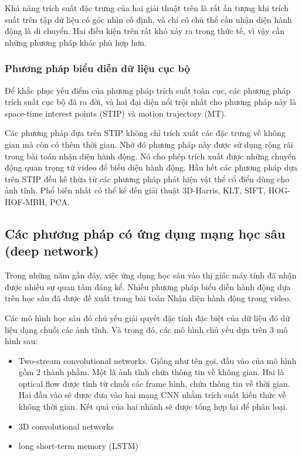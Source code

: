 Khả năng trích suất đặc trưng của hai giải thuật trên là rất ấn tượng khi trích suất trên tập dữ liệu có góc nhìn cố định, và chỉ có chủ thể cần nhận diện hành động là di chuyển. Hai điều kiện trên rất khó xảy ra trong thức tế, vì vậy cần những phương pháp khác phù hợp hơn.


\subsubsection{Phương pháp biểu diễn dữ liệu cục bộ}

Để khắc phục yếu điểm của phương pháp trích suất toàn cục, các phương pháp trích suất cục bộ đã ra đời, và hai đại diện nổi trội nhất cho phương pháp này là space-time interest points (STIP) và motion trajectory (MT).

Các phương pháp dựa trên STIP không chỉ trích xuất các đặc trưng về không gian mà còn có thêm thời gian. Nhờ đó phương pháp này được sử dụng rộng rãi trong bài toán nhận diện hành động. Nó cho phép trích xuất được những chuyển động quan trọng từ video để biểu diện hành động. Hầu hết các phương pháp dựa trên STIP đều kế thừa từ các phương pháp phát hiện vật thể cổ điển dùng cho ảnh tĩnh. Phổ biến nhất có thể kể đến giải thuật 3D-Harris, KLT, SIFT, HOG-HOF-MBH, PCA.




\subsection{Các phương pháp có ứng dụng mạng học sâu (deep network)}

Trong những năm gần đây, việc ứng dụng học sâu vào thị giác máy tính đã nhận được nhiều sự quan tâm đáng kể. Nhiều phương pháp biểu diễn hành động dựa trên học sâu đã được đề xuất trong bài toán Nhận diện hành động trong video.

Các mô hình học sâu đó chủ yếu giải quyết đặc tính đặc biệt của dữ liệu đó dữ liệu dạng chuỗi các ảnh tĩnh. Và trong đó, các mô hình chủ yếu dựa trên 3 mô hình sau:

\begin{itemize}
    \item Two-stream convolutional networks. Giống như tên gọi, đầu vào của mô hình gồm 2 thành phầm. Một là ảnh tĩnh chứa thông tin về không gian. Hai là optical flow được tính từ chuỗi các frame hình, chứa thông tin về thời gian. Hai đầu vào sẽ được đưa vào hai mạng CNN nhằm trích suất kiến thức về không thời gian. Kết quả của hai nhánh sẽ được tổng hợp lại để phân loại.
    \item 3D convolutional networks
    \item long short-term memory (LSTM)
\end{itemize}